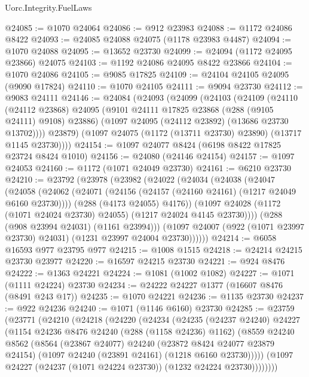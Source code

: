 \begin{lexlean}{Uorc.Integrity.FuelLaws}
\begin{coremodule}
@24085 := @1070 @24064
@24086 := @912 @23983
@24088 := @1172 @24086 @8422
@24093 := @24085 @24088 @24075 (@1178 @23983 @4487)
@24094 := @1070 @24088
@24095 := @13652 @23730
@24099 := @24094 (@1172 @24095 @23866) @24075
@24103 := @1192 @24086 @24095 @8422 @23866
@24104 := @1070 @24086
@24105 := @9085 @17825
@24109 := @24104 @24105 @24095 (@9090 @17824)
@24110 := @1070 @24105
@24111 := @9094 @23730
@24112 := @9083 @24111
@24146 := @24084
    (@24093
      (@24099
        (@24103
          (@24109
            (@24110
              (@24112 @23868)
              @24095
              (@9101 @24111 @17825 @23868 (@288 (@9105 @24111) @9108) @23886)
              (@1097 @24095 (@24112 @23892) (@13686 @23730 @13702))))
          @23879)
        (@1097 @24075 (@1172 (@13711 @23730) @23890) (@13717 @1145 @23730))))
@24154 := @1097 @24077 @8424 (@6198 @8422 @17825 @23724 @8424 @1010)
@24156 := @24080 (@24146 @24154)
@24157 := @1097 @24053
@24160 := @1172 (@1071 @24049 @23730)
@24161 := @6210 @23730
@24210 := @23792
    (@23978
      (@23982
        (@24022
          (@24034
            (@24038
              (@24047
                (@24058
                  (@24062
                    (@24071 (@24156 (@24157 (@24160 @24161) (@1217 @24049 @6160 @23730))))
                    (@288 (@4173 @24055) @4176))
                  (@1097 @24028 (@1172 (@1071 @24024 @23730) @24055) (@1217 @24024 @4145 @23730))))
              (@288 (@908 @23994 @24031) (@1161 @23994)))
            (@1097 @24007 (@922 (@1071 @23997 @23730) @24031) (@1231 @23997 @24004 @23730))))))
@24214 := @6058 @16593 @977 @23795 @977
@24215 := @1008 @1515
@24218 := @24214 @24215 @23730 @23977
@24220 := @16597 @24215 @23730
@24221 := @924 @8476
@24222 := @1363 @24221
@24224 := @1081 (@1002 @1082)
@24227 := @1071 (@1111 @24224) @23730
@24234 := @24222 @24227 @1377 (@16607 @8476 (@8491 @243 @17))
@24235 := @1070 @24221
@24236 := @1135 @23730
@24237 := @922 @24236
@24240 := @1071 (@1146 @6160) @23730
@24285 := @23759
    (@23771
      (@24210
        (@24218
          (@24220
            (@24234
              (@24235
                (@24237 @24240)
                @24227
                (@1154
                  @24236
                  @8476
                  @24240
                  (@288 (@1158 @24236) @1162)
                  (@8559
                    @24240
                    @8562
                    (@8564
                      (@23867 @24077)
                      @24240
                      (@23872 @8424 @24077 @23879 @24154)
                      (@1097 @24240 (@23891 @24161) (@1218 @6160 @23730)))))
                (@1097 @24227 (@24237 (@1071 @24224 @23730)) (@1232 @24224 @23730))))))))

\end{coremodule}
\end{lexlean}
